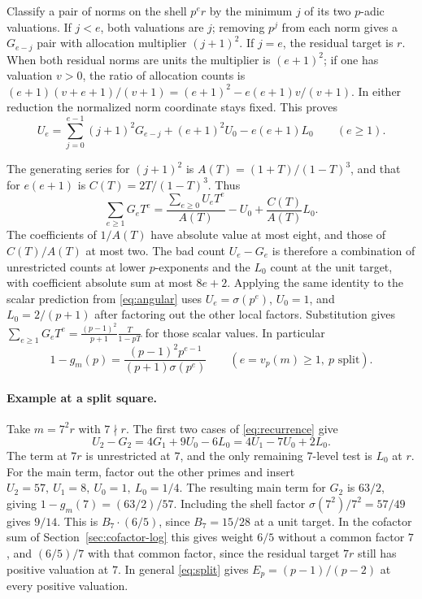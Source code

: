 Classify a pair of norms on the shell \(p^e r\) by the minimum
\(j\) of its two \(p\)-adic valuations. If \(j<e\), both valuations
are \(j\); removing \(p^j\) from each norm gives a \(G_{e-j}\)
pair with allocation multiplier \((j+1)^2\). If \(j=e\), the
residual target is \(r\). When both residual norms are units
the multiplier is \((e+1)^2\); if one has valuation \(v>0\),
the ratio of allocation counts is
\((e+1)(v+e+1)/(v+1)=(e+1)^2-e(e+1)v/(v+1)\).
In either reduction the normalized norm coordinate stays fixed.
This proves
\begin{equation}\label{eq:recurrence}
 U_e=\sum_{j=0}^{e-1}(j+1)^2 G_{e-j}+(e+1)^2 U_0-e(e+1)L_0
 \qquad(e\ge1).
\end{equation}

The generating series for \((j+1)^2\) is
\(A(T)=(1+T)/(1-T)^3\), and that for \(e(e+1)\) is
\(C(T)=2T/(1-T)^3\). Thus
\[
 \sum_{e\ge1}G_eT^e=\frac{\sum_{e\ge0}U_eT^e}{A(T)}
                     -U_0+\frac{C(T)}{A(T)}L_0 .
\]
The coefficients of \(1/A(T)\) have absolute value at most eight,
and those of \(C(T)/A(T)\) at most two. The bad count \(U_e-G_e\)
is therefore a combination of unrestricted counts at lower
\(p\)-exponents and the \(L_0\) count at the unit target, with
coefficient absolute sum at most \(8e+2\). Applying the same
identity to the scalar prediction from \eqref{eq:angular} uses
\(U_e=\sigma(p^e)\), \(U_0=1\), and \(L_0=2/(p+1)\) after
factoring out the other local factors. Substitution gives
\(\sum_{e\ge1}G_e T^e=\frac{(p-1)^2}{p+1}\frac{T}{1-pT}\)
for those scalar values. In particular
\begin{equation}\label{eq:split}
 1-g_m(p)=\frac{(p-1)^2p^{e-1}}{(p+1)\sigma(p^e)}
                 \qquad(e=v_p(m)\ge1,\ p\text{ split}).
\end{equation}

\paragraph{Example at a split square.}\label{sec:split-example}
Take \(m=7^2r\) with \(7\nmid r\). The first two cases of
\eqref{eq:recurrence} give
\[
 U_2-G_2=4G_1+9U_0-6L_0=4U_1-7U_0+2L_0 .
\]
The term at \(7r\) is unrestricted at \(7\), and the only
remaining \(7\)-level test is \(L_0\) at \(r\). For the main
term, factor out the other primes and insert
\(U_2=57,\ U_1=8,\ U_0=1,\ L_0=1/4\).
The resulting main term for \(G_2\) is \(63/2\), giving
\(1-g_m(7)=(63/2)/57\).
Including the shell factor \(\sigma(7^2)/7^2=57/49\) gives
\(9/14\). This is \(B_7\cdot(6/5)\), since \(B_7=15/28\)
at a unit target. In the cofactor sum of Section~\ref{sec:cofactor-log}
this gives weight \(6/5\) without a common factor \(7\), and
\((6/5)/7\) with that common factor, since the residual target
\(7r\) still has positive valuation at \(7\). In general
\eqref{eq:split} gives \(E_p=(p-1)/(p-2)\) at every positive
valuation.

